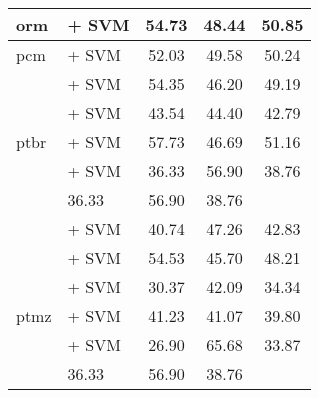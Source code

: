 \begin{longtable}{llccc}
    \midrule
    orm                                & \citep{wang2024multilingual} + SVM                                 & 54.73                                & 48.44              & 50.85             \\
    \midrule
    pcm                                & \citep{wang2024multilingual} + SVM                                 & 52.03                                & 49.58              & 50.24             \\
    \midrule
    \multirow{5}{*}{ptbr}              & \citep{wang2024multilingual} + SVM                                 & 54.35                                & 46.20              & 49.19             \\
                                       & \citep{filho2023bertportuguesenliassin2} + SVM                     & 43.54                                & 44.40              & 42.79             \\
                                       & \citep{souza2020bertimbau} + SVM                                   & 57.73                                & 46.69              & 51.16             \\
                                       & \citep{melo2023bertlargeportuguesests} + SVM                       & 36.33                                & 56.90              & 38.76             \\                                             & 36.33                                & 56.90              & 38.76             \\
                                       & \citep{sturua2024jinaembeddingsv3multilingualembeddingstask} + SVM & 40.74                                & 47.26              & 42.83             \\
    \midrule
    \multirow{5}{*}{ptmz}              & \citep{wang2024multilingual} + SVM                                 & 54.53                                & 45.70              & 48.21             \\
                                       & \citep{filho2023bertportuguesenliassin2} + SVM                     & 30.37                                & 42.09              & 34.34             \\
                                       & \citep{souza2020bertimbau} + SVM                                   & 41.23                                & 41.07              & 39.80             \\
                                       & \citep{melo2023bertlargeportuguesests} + SVM                       & 26.90                                & 65.68              & 33.87             \\                                       & 36.33                                & 56.90              & 38.76             \\

\end{longtable}
